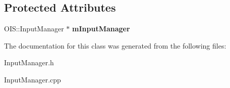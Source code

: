 \subsection*{Protected Attributes}
\begin{DoxyCompactItemize}
\item 
\hypertarget{class_input_manager_aee067bb5dcb7166ed63b4e992255ccaa}{}O\+I\+S\+::\+Input\+Manager $\ast$ {\bfseries m\+Input\+Manager}\label{class_input_manager_aee067bb5dcb7166ed63b4e992255ccaa}

\end{DoxyCompactItemize}


The documentation for this class was generated from the following files\+:\begin{DoxyCompactItemize}
\item 
Input\+Manager.\+h\item 
Input\+Manager.\+cpp\end{DoxyCompactItemize}
